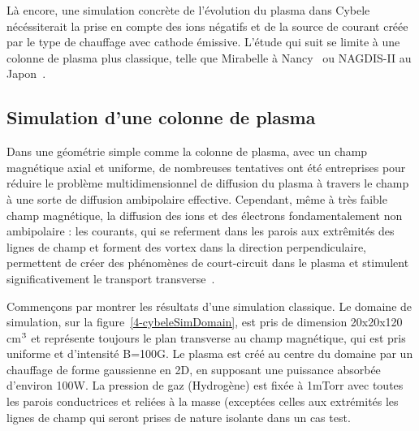 \begin{refsection}
Là encore, une simulation concrète de l'évolution du plasma dans
Cybele nécéssiterait la prise en compte des ions négatifs et de la source de
courant créée par le type de chauffage avec cathode émissive. L'étude qui suit
se limite à une colonne de plasma plus classique, telle que Mirabelle à
Nancy~\parencite{Mirabelle} ou NAGDIS-II au Japon~\parencite{NAGDIS1}.
 
\subsection{Simulation d'une colonne de plasma}

Dans une géométrie simple comme la colonne de plasma, avec un champ magnétique
axial et uniforme, de nombreuses tentatives ont été entreprises pour réduire le
problème multidimensionnel de diffusion du plasma à travers le champ à une
sorte de diffusion ambipolaire effective. Cependant, même à très faible champ
magnétique, la diffusion des ions et des électrons fondamentalement non
ambipolaire : les courants, qui se referment dans les parois aux extrêmités des
lignes de champ et forment des vortex dans la direction perpendiculaire,
permettent de créer des phénomènes de court-circuit dans le plasma et stimulent
significativement le transport transverse~\parencite{Gurevich}.

Commençons par montrer les résultats d'une simulation classique. Le domaine de
simulation, sur la figure~\ref{4-cybeleSimDomain}, est pris de dimension
20x20x120 cm$^{{3}}$ et représente toujours le plan transverse au champ
magnétique, qui est pris uniforme et d'intensité B=100G. Le plasma est créé au
centre du domaine par un chauffage de forme gaussienne en 2D, en supposant une
puissance absorbée d'environ 100W. La pression de gaz (Hydrogène) est fixée à
1mTorr avec toutes les parois conductrices et reliées à la masse (exceptées
celles aux extrémités les lignes de champ qui seront prises de nature isolante
dans un cas test.


\end{refsection}
